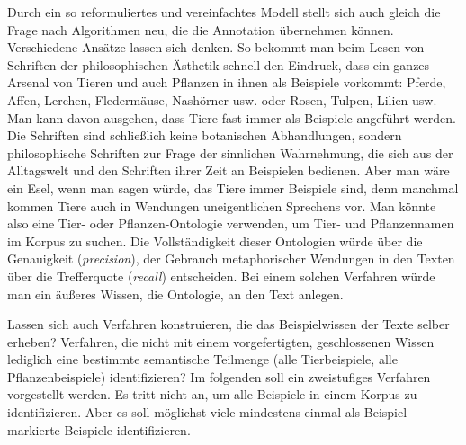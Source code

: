 \documentclass{article}
\newcommand*{\englisch}[1]{\foreignlanguage{english}{\textit{#1}}}%
\renewcommand*{\see}{\autocap{v}gl\adddot}%
\begin{document}
Durch ein so reformuliertes und vereinfachtes Modell stellt sich auch
gleich die Frage nach Algorithmen neu, die die Annotation übernehmen
können. Verschiedene Ansätze lassen sich denken. So bekommt man beim
Lesen von Schriften der philosophischen Ästhetik schnell den Eindruck,
dass ein ganzes Arsenal von Tieren und auch Pflanzen in ihnen als
Beispiele vorkommt: Pferde, Affen, Lerchen, Fledermäuse, Nashörner
usw. oder Rosen, Tulpen, Lilien usw. Man kann davon ausgehen, dass
Tiere fast immer als Beispiele angeführt werden. Die Schriften sind
schließlich keine botanischen Abhandlungen, sondern philosophische
Schriften zur Frage der sinnlichen Wahrnehmung, die sich aus der
Alltagswelt und den Schriften ihrer Zeit an Beispielen bedienen. Aber
man wäre ein Esel, wenn man sagen würde, das Tiere immer Beispiele
sind, denn manchmal kommen Tiere auch in Wendungen uneigentlichen
Sprechens vor. Man könnte also eine Tier- oder Pflanzen-Ontologie
verwenden, um Tier- und Pflanzennamen im Korpus zu suchen. Die
Vollständigkeit dieser Ontologien würde über die Genauigkeit
(\englisch{precision}), der Gebrauch metaphorischer Wendungen in den
Texten über die Trefferquote (\englisch{recall}) entscheiden. Bei
einem solchen Verfahren würde man ein äußeres Wissen, die Ontologie,
an den Text anlegen.

Lassen sich auch Verfahren konstruieren, die das Beispielwissen der
Texte selber erheben? Verfahren, die nicht mit einem vorgefertigten,
geschlossenen Wissen lediglich eine bestimmte semantische Teilmenge
(alle Tierbeispiele, alle Pflanzenbeispiele) identifizieren? Im
folgenden soll ein zweistufiges Verfahren vorgestellt
werden. \Parencite[\see\ jetzt auch][]{CL2019d} Es tritt nicht an, um
alle Beispiele in einem Korpus zu identifizieren. Aber es soll
möglichst viele mindestens einmal als Beispiel markierte Beispiele
identifizieren.
\end{document}
